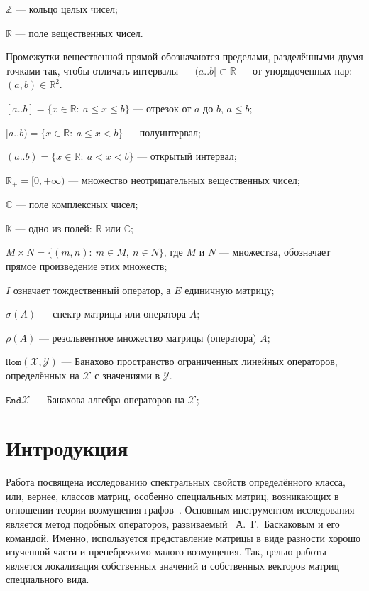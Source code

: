 \documentclass[14pt,a4paper]{extarticle}
\theoremstyle{definition}
\begin{document}
\( \mathbb{Z} \) --- кольцо целых чисел;

\( \mathbb{R} \) --- поле вещественных чисел.

Промежутки вещественной прямой обозначаются пределами, разделёнными двумя
точками так, чтобы отличать интервалы  ---
\( (a..b] \subset \mathbb{R} \) --- от упорядоченных пар: \( (a, b)\in\mathbb{R}^2 \).

\( [a..b] = \{ x\in\mathbb{R}:\ a\leq x\leq b\} \) --- отрезок
от \( a \) до \( b \), \( a\leq b \);

\( [a..b) = \{ x\in\mathbb{R}:\ a\leq x < b\} \) --- полуинтервал;

\( (a..b) = \{ x\in\mathbb{R}:\ a < x < b\} \) --- открытый интервал;

\( \mathbb{R}_+ = [0,+\infty) \) --- множество неотрицательных вещественных чисел;

\( \mathbb{C} \) --- поле комплексных чисел;

\( \mathbb{K} \) --- одно из полей: \( \mathbb{R} \) или \( \mathbb{C} \);

\( M{\times}N = \{ (m, n):\ m{\in}M,\ n{\in}N \} \), где \( M \) и \( N \)
--- множества, обозначает прямое произведение этих множеств;

\( I \) означает тождественный оператор, а \( E \) единичную матрицу;

\( \sigma(A) \) --- спектр матрицы или оператора \( A \);

\( \rho(A) \) --- резольвентное множество матрицы (оператора) \( A \);

\( \mathtt{Hom}(\mathscr{X}, \mathscr{Y})\) --- Банахово пространство ограниченных
линейных операторов, определённых на \( \mathscr{X} \) с значениями в \( \mathscr{Y} \).

\( \mathtt{End}\mathscr{X} \) --- Банахова алгебра операторов на
\( \mathscr{X} \);

\newpage

\section*{Интродукция}
Работа посвящена исследованию спектральных свойств определённого класса, или,
вернее, классов матриц,
особенно специальных матриц, возникающих в отношении теории возмущения
графов~\cite{cvetkovic1997eigenspaces}.
Основным инструментом исследования является метод подобных операторов,
развиваемый~\cite{baskakov1986theorem,baskakov1987theorem,baskakov1994spectral,baskakov2002splitting}
А.~Г.~Баскаковым и его командой. Именно, используется представление матрицы
в виде разности хорошо изученной части и пренебрежимо-малого возмущения.
Так, целью работы является локализация собственных значений и собственных векторов
матриц специального вида.
\end{document}
